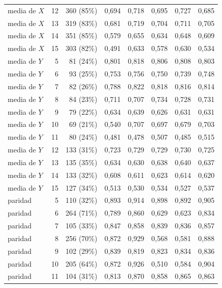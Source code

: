 \begin{table}[htbp]
{\begin{tabular}{@{}lrrrrrrr@{}}
        media de $X$ & 12 & 360 (85\%) & 0,694 & 0,718 & 0,695 & 0,727 & 0,685 \\
        media de $X$ & 13 & 319 (83\%) & 0,681 & 0,719 & 0,704 & 0,711 & 0,705 \\
        media de $X$ & 14 & 351 (85\%) & 0,579 & 0,655 & 0,634 & 0,648 & 0,609 \\
        media de $X$ & 15 & 303 (82\%) & 0,491 & 0,633 & 0,578 & 0,630 & 0,534 \\
        media de $Y$ & 5 & 81 (24\%) & 0,801 & 0,818 & 0,806 & 0,808 & 0,803 \\
        media de $Y$ & 6 & 93 (25\%) & 0,753 & 0,756 & 0,750 & 0,739 & 0,748 \\
        media de $Y$ & 7 & 82 (26\%) & 0,788 & 0,822 & 0,818 & 0,816 & 0,814 \\
        media de $Y$ & 8 & 84 (23\%) & 0,711 & 0,707 & 0,734 & 0,728 & 0,731 \\
        media de $Y$ & 9 & 79 (22\%) & 0,634 & 0,639 & 0,626 & 0,631 & 0,631 \\
        media de $Y$ & 10 & 69 (21\%) & 0,540 & 0,707 & 0,697 & 0,679 & 0,703 \\
        media de $Y$ & 11 & 80 (24\%) & 0,481 & 0,478 & 0,507 & 0,485 & 0,515 \\
        media de $Y$ & 12 & 133 (31\%) & 0,723 & 0,729 & 0,729 & 0,730 & 0,725 \\
        media de $Y$ & 13 & 135 (35\%) & 0,634 & 0,630 & 0,638 & 0,640 & 0,637 \\
        media de $Y$ & 14 & 133 (32\%) & 0,608 & 0,611 & 0,623 & 0,614 & 0,620 \\
        media de $Y$ & 15 & 127 (34\%) & 0,513 & 0,530 & 0,534 & 0,527 & 0,537 \\
        paridad & 5 & 110 (32\%) & 0,893 & 0,914 & 0,898 & 0,892 & 0,905 \\
        paridad & 6 & 264 (71\%) & 0,789 & 0,860 & 0,629 & 0,623 & 0,834 \\
        paridad & 7 & 105 (33\%) & 0,847 & 0,858 & 0,839 & 0,836 & 0,857 \\
        paridad & 8 & 256 (70\%) & 0,872 & 0,929 & 0,568 & 0,581 & 0,888 \\
        paridad & 9 & 102 (29\%) & 0,839 & 0,819 & 0,823 & 0,834 & 0,836 \\
        paridad & 10 & 205 (64\%) & 0,872 & 0,926 & 0,510 & 0,584 & 0,904 \\
        paridad & 11 & 104 (31\%) & 0,813 & 0,870 & 0,858 & 0,865 & 0,863 \\

\end{tabular}}
\end{table}

